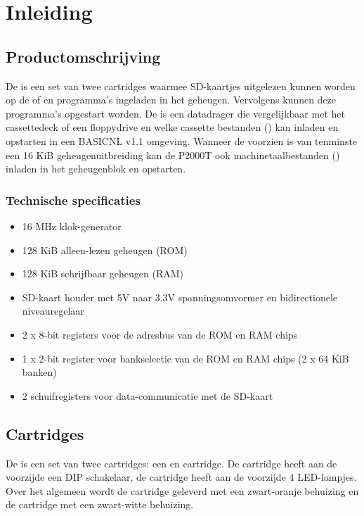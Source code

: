\chapter{Inleiding}
\chapterpreamble

%
%
%
\section{Productomschrijving}

De \product is een set van twee cartridges waarmee SD-kaartjes uitgelezen kunnen worden op de  of  en programma's ingeladen in het geheugen. Vervolgens kunnen deze programma's opgestart worden. De \product is een datadrager die vergelijkbaar met het cassettedeck of een floppydrive en welke cassette bestanden () kan inladen en opstarten in een BASICNL v1.1 omgeving. Wanneer de  voorzien is van tenminste een 16 KiB geheugenuitbreiding kan de P2000T ook machinetaalbestanden () inladen in het geheugenblok  en opstarten.

%
%
\subsection{Technische specificaties}

\begin{itemize}[noitemsep]
    \item 16 MHz klok-generator
    \item 128 KiB alleen-lezen geheugen (ROM)
    \item 128 KiB schrijfbaar geheugen (RAM)
    \item SD-kaart houder met 5V naar 3.3V spanningsomvormer en bidirectionele niveauregelaar
    \item 2 x 8-bit registers voor de adresbus van de ROM en RAM chips
    \item 1 x 2-bit register voor bankselectie van de ROM en RAM chips (2 x 64 KiB banken)
    \item 2 schuifregisters voor data-communicatie met de SD-kaart
\end{itemize}

%
%
%
\section{Cartridges}

De \product is een set van twee cartridges: een  en  cartridge. De  cartridge heeft aan de voorzijde een DIP schakelaar, de  cartridge heeft aan de voorzijde 4 LED-lampjes. Over het algemeen wordt de  cartridge geleverd met een zwart-oranje behuizing en de  cartridge met een zwart-witte behuizing.

